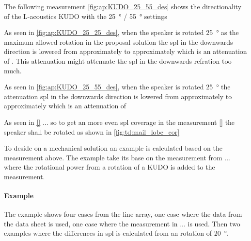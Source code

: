 
The following measurement \autoref{fig:ap:KUDO_25_55_des} shows the directionality of the L-acoustics KUDO with the \SI{25}{\degree} / \SI{55}{\degree} settings 


As seen in \autoref{fig:ap:KUDO_25_25_des}, when the speaker is rotated \SI{25}{\degree} as the maximum allowed rotation in the proposal solution the \gls{spl} in the downwards direction is lowered from approximately  to approximately  which is an attenuation of . This  attenuation might attenuate the \gls{spl} in the downwards refration too much.   

As seen in \autoref{fig:ap:KUDO_25_55_des}, when the speaker is rotated \SI{25}{\degree} the attenuation \gls{spl} in the downwards direction is lowered from approximately  to approximately  which is an attenuation of 





As seen in  \autoref{} ... so to get an more even \gls{spl} coverage in the measurement \autoref{} the speaker shall be rotated as shown in \autoref{fig:td:mail_lobe_cor} 




To deside on a mechanical solution an example is calculated based on the measurement above. The example take its base on the measurement from ... where the rotational power from a rotation of a KUDO is added to the measurement. 

\paragraph{Example} The example shows four cases from the line array, one case where the data from the data sheet is used, one case where the measurement in ... is used. Then two examples where the differences in \gls{spl} is calculated from an rotation of \SI{20}{\degree}.


